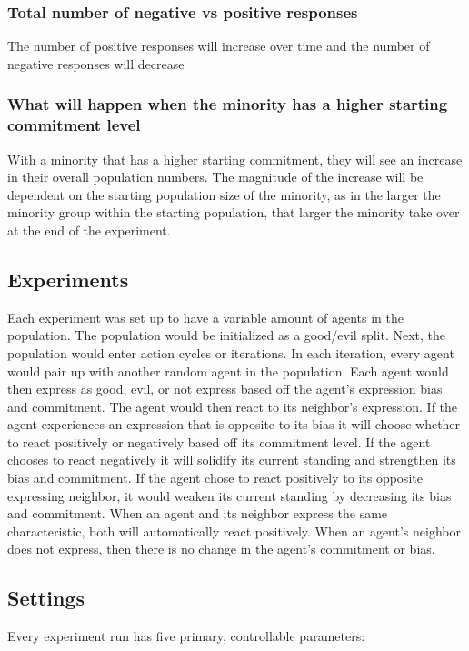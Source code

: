 \documentclass[]{article}
\begin{document}
\subsubsection{Total number of negative vs positive responses} The number of positive responses will increase over time and the number of negative responses will decrease


\subsubsection{What will happen when the minority has a higher starting commitment level} With a minority that has a higher starting commitment, they will see an increase in their overall population numbers. The magnitude of the increase will be dependent on the starting population size of the minority, as in the larger the minority group within the starting population, that larger the minority take over at the end of the experiment. 



\subsection{Experiments}
Each experiment was set up to have a variable amount of agents in the population. The population would be initialized as a good/evil split. Next, the population would enter action cycles or iterations. In each iteration, every agent would pair up with another random agent in the population. Each agent would then express as good, evil, or not express based off the agent's expression bias and commitment. The agent would then react to its neighbor's expression. If the agent experiences an expression that is opposite to its bias it will choose whether to react positively or negatively based off its commitment level. If the agent chooses to react negatively it will solidify its current standing and strengthen its bias and commitment. If the agent chose to react positively to its opposite expressing neighbor, it would weaken its current standing by decreasing its bias and commitment. When an agent and its neighbor express the same characteristic, both will automatically react positively. When an agent's neighbor does not express, then there is no change in the agent's commitment or bias.

\subsection{Settings}
Every experiment run has five primary, controllable parameters:
\end{document}
